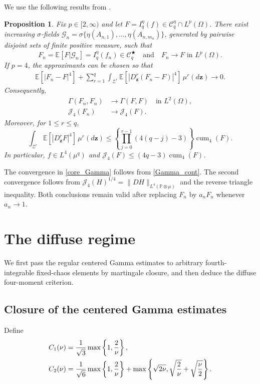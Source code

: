 \documentclass[letterpaper,11pt,reqno]{amsart}
\numberwithin{equation}{section}
\theoremstyle{plain}
\newtheorem{proposition}[theorem]{Proposition}
\theoremstyle{definition}
\theoremstyle{remark}
\newcommand{\E}{\mathbb{E}}
\newcommand{\PP}{\mathbb{P}}
\newcommand{\cC}{\mathcal{C}}
\newcommand{\cG}{\mathcal{G}}
\newcommand{\cZ}{\mathcal{Z}}
\DeclareMathOperator{\cum}{cum}
\newcommand{\noi}{\noindent}
\newcommand{\dd}{d}
\newcommand{\ot}{\otimes}
\newcommand{\Jfour}{\mathcal J_4}
\newcommand{\Gam}{\Gamma}
\newcommand{\s}{\sigma}
\begin{document}
We use the following results from
\cite[Theorems~1.7--1.8, Corollary~2.1, and
Proposition~1.10]{Zhe26a}.

\begin{proposition}
\label{prop_core}
Fix $p\in[2,\infty)$ and let
$F=I_q^\eta(f)\in\cC_q^\eta\cap L^p(\Omega)$.  There exist increasing
$\s$-fields
$\cG_n=\s\{\eta(A_{n,1}),\ldots,\eta(A_{n,m_n})\}$, generated by
pairwise disjoint sets of finite positive measure, such that
\[
 F_n=\E[F | \cG_n]=I_q^\eta(f_n)\in\cC_q^{\bigstar}
 \quad\text{and}\quad F_n\longrightarrow F\text{ in }L^p(\Omega).
\]
If $p=4$, the approximants can be chosen so that
\noi
\begin{align}
 \E[|F_n-F|^4]
 +\sum_{r=1}^q\int_{\cZ^r}
 \E[|D^r_{\boldsymbol z}(F_n-F)|^4]
 \,\mu^r(\dd\boldsymbol z)
 \longrightarrow0.
 \label{core_graph}
\end{align}
Consequently,
\noi
\begin{align}
 \Gam(F_n,F_n)&\longrightarrow\Gam(F,F)
 \quad\text{in }L^2(\Omega),
 \label{core_Gamma}\\
 \Jfour(F_n)&\longrightarrow\Jfour(F).
 \label{core_J4}
\end{align}
Moreover, for $1\leq r\leq q$,
\[
 \int_{\cZ^r}\E[|D^r_{\boldsymbol z}F|^4]
 \,\mu^r(\dd\boldsymbol z)
 \leq
 \left\{\prod_{j=0}^{r-1}(4(q-j)-3)\right\}\cum_4(F).
\]
In particular, $f\in L^4(\mu^q)$ and
$\Jfour(F)\leq(4q-3)\cum_4(F)$.
\end{proposition}

The convergence in \eqref{core_Gamma} follows from
\eqref{Gamma_cont}.  The second convergence follows from
$\Jfour(H)^{1/4}=\|DH\|_{L^4(\PP\ot\mu)}$ and the reverse triangle
inequality.  Both conclusions remain valid after replacing $F_n$ by
$a_nF_n$ whenever $a_n\to1$.

\section{The diffuse regime}
\label{SEC3}


We first pass the regular centered Gamma estimates to arbitrary
fourth-integrable fixed-chaos elements by martingale closure, and then
deduce the diffuse four-moment criterion.

\subsection{Closure of the centered Gamma estimates}
\label{SEC_32}

Define
\noi
\begin{align}
 C_1(\nu)
 &=\frac1{\sqrt3}\max\left\{1,\frac2\nu\right\},
 \notag\\
 C_2(\nu)
 &=\frac1{\sqrt6}\max\left\{1,\frac2\nu\right\}
 +\max\left\{
 \sqrt{2\nu},
 \sqrt{\frac2\nu}+\sqrt{\frac\nu2}
 \right\}.
 \label{C_def}
\end{align}
\end{document}
